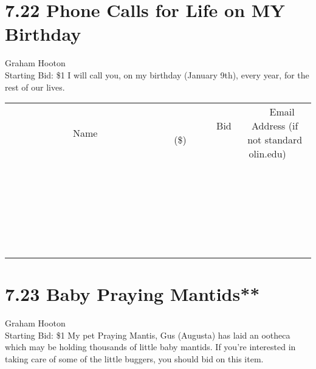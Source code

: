 \documentclass[11pt]{article}
\begin{document}
\section*{7.22 Phone Calls for Life on MY Birthday}
Graham Hooton
\\
Starting Bid: \$1
\newline
I will call you, on my birthday (January 9th), every year, for the rest of our lives.
\\[6ex]
\begin{tabular}{c c c}
~~~~~~~~~~~~~Name~~~~~~~~~~~~~ & ~~~~~~~~~Bid (\$)~~~~~~~~~  & ~~~Email Address (if not standard olin.edu)~~~\\
 & & \\
\hline
 & & \\
\hline
 & & \\
\hline
 & & \\
\hline
 & & \\
\hline
 & & \\
\hline
 & & \\
\hline
 & & \\
\hline
 & & \\
\hline
 & & \\
\hline
 & & \\
\hline
 & & \\
\hline
 & & \\
\hline
 & & \\
\hline
 & & \\
\hline
 & & \\
\hline
 & & \\
\hline
 & & \\
\hline
 & & \\
\hline
 & & \\
\hline
 & & \\
\hline
 & & \\
\hline
 & & \\
\hline
 & & \\
\hline
 & & \\
\hline
 & & \\
\hline
\end{tabular}
\newpage
\section*{7.23 Baby Praying Mantids**}
Graham Hooton
\\
Starting Bid: \$1
\newline
My pet Praying Mantis, Gus (Augusta) has laid an ootheca which may be holding thousands of little baby mantids. If you're interested in taking care of some of the little buggers, you should bid on this item. 
\end{document}
